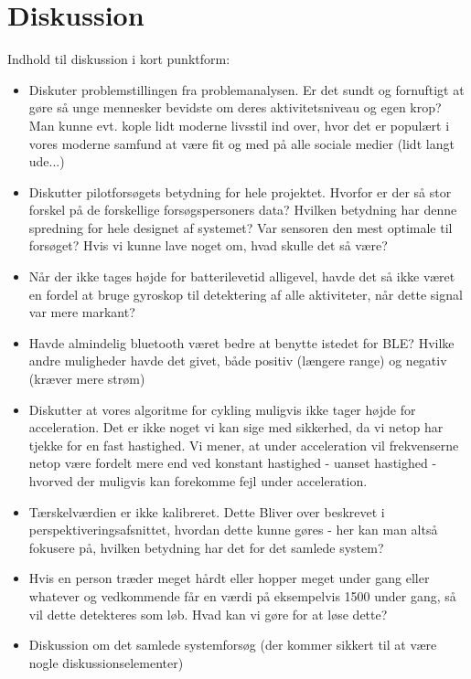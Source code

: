\section{Diskussion}\label{sec:diskussion}

Indhold til diskussion i kort punktform:
\begin{itemize}
	\item Diskuter problemstillingen fra problemanalysen. Er det sundt og fornuftigt at gøre så unge mennesker bevidste om deres aktivitetsniveau og egen krop? Man kunne evt. kople lidt moderne livsstil ind over, hvor det er populært i vores moderne samfund at være fit og med på alle sociale medier (lidt langt ude...)
	\item Diskutter pilotforsøgets betydning for hele projektet. Hvorfor er der så stor forskel på de forskellige forsøgspersoners data? Hvilken betydning har denne spredning for hele designet af systemet? Var sensoren den mest optimale til forsøget? Hvis vi kunne lave noget om, hvad skulle det så være?
	\item Når der ikke tages højde for batterilevetid alligevel, havde det så ikke været en fordel at bruge gyroskop til detektering af alle aktiviteter, når dette signal var mere markant? 
	\item Havde almindelig bluetooth været bedre at benytte istedet for BLE? Hvilke andre muligheder havde det givet, både positiv (længere range) og negativ (kræver mere strøm)
	\item Diskutter at vores algoritme for cykling muligvis ikke tager højde for acceleration. Det er ikke noget vi kan sige med sikkerhed, da vi netop har tjekke for en fast hastighed. Vi mener, at under acceleration vil frekvenserne netop være fordelt mere end ved konstant hastighed - uanset hastighed - hvorved der muligvis kan forekomme fejl under acceleration.
	\item Tærskelværdien er ikke kalibreret. Dette Bliver over beskrevet i perspektiveringsafsnittet, hvordan dette kunne gøres - her kan man altså fokusere på, hvilken betydning har det for det samlede system?
	\item Hvis en person træder meget hårdt eller hopper meget under gang eller whatever og vedkommende får en værdi på eksempelvis 1500 under gang, så vil dette detekteres som løb. Hvad kan vi gøre for at løse dette?
	\item Diskussion om det samlede systemforsøg (der kommer sikkert til at være nogle diskussionselementer)
\end{itemize}
